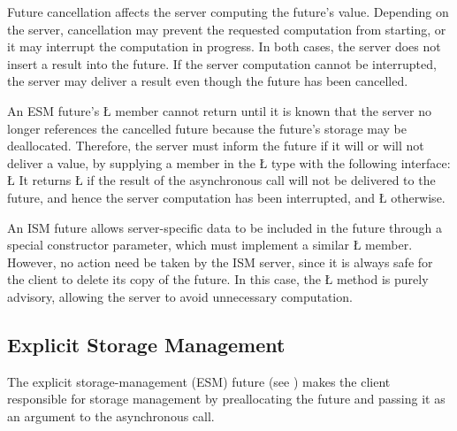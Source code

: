 \documentclass[openright,twoside]{report}
\begin{document}
Future cancellation affects the server computing the future's value.
Depending on the server, cancellation may prevent the requested computation from starting, or it may interrupt the computation in progress.
In both cases, the server does not insert a result into the future.
If the server computation cannot be interrupted, the server may deliver a result even though the future has been cancelled.

An ESM future's \LGinlinetrue\LGbegin\lgrinde\L{}\endlgrinde\LGend{} member cannot return until it is known that the server no longer references the cancelled future because the future's storage may be deallocated.
Therefore, the server must inform the future if it will or will not deliver a value, by supplying a member in the \LGinlinetrue\LGbegin\lgrinde\L{}\endlgrinde\LGend{} type with the following interface:
\LGinlinefalse\LGbegin\lgrinde
\L{}
\endlgrinde\LGend
It returns \LGinlinetrue\LGbegin\lgrinde\L{}\endlgrinde\LGend{} if the result of the asynchronous call will not be delivered to the future, and hence the server computation has been interrupted, and \LGinlinetrue\LGbegin\lgrinde\L{}\endlgrinde\LGend{} otherwise.

An ISM future allows server-specific data to be included in the future through a special constructor parameter, which must implement a similar \LGinlinetrue\LGbegin\lgrinde\L{}\endlgrinde\LGend{} member.
However, no action need be taken by the ISM server, since it is always safe for the client to delete its copy of the future.
In this case, the \LGinlinetrue\LGbegin\lgrinde\L{}\endlgrinde\LGend{} method is purely advisory, allowing the server to avoid unnecessary computation.


\subsection{Explicit Storage Management}

The explicit storage-management (ESM) future (see ) makes the client responsible for storage management by preallocating the future and passing it as an argument to the asynchronous call.
\end{document}
